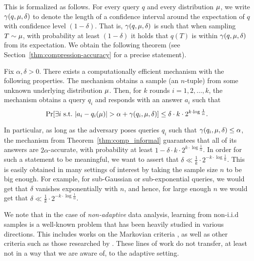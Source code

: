 \documentclass[12pt,a4paper,oneside,onecolumn]{book}
\begin{document}
This is formalized as follows. For every query $q$ and every distribution 
$\mu$, we write $\gamma(q,\mu,\delta)$ to denote the length of a confidence interval around the expectation of $q$ with confidence level $(1-\delta)$. That is, $\gamma(q,\mu,\delta)$ is such that when sampling $T\sim\mu$, with probability at least $(1-\delta)$ it holds that $q(T)$ is within $\gamma(q,\mu,\delta)$ from its expectation. We obtain the following theorem (see Section~\ref{thm:compression-accuracy} for a precise statement).

\begin{theorem}[informal]\label{thm:comp_informal}
Fix $\alpha,\delta>0$. 
There exists a computationally efficient mechanism with the following properties. The mechanism obtains a sample (an $n$-tuple) from some unknown underlying distribution $\mu$. Then, for $k$ rounds $i=1,2,\dots,k$, the mechanism obtains a query $q_i$ and responds with an answer $a_i$ such that 
$$
\Pr[\exists i \text{ s.t.\ } |a_i-q_i(\measure)|>\alpha+\gamma(q_i,\measure,\delta)]\leq \delta\cdot k \cdot 2^{k\cdot\log\frac{1}{\alpha}}.
$$
\end{theorem}

In particular, as long as the adversary poses queries $q_i$ such that $\gamma(q_i,\mu,\delta)\leq\alpha$, the mechanism from Theorem~\ref{thm:comp_informal} guarantees that all of its answers are $2\alpha$-accurate, with probability at least $1-\delta\cdot k \cdot 2^{k\cdot\log\frac{1}{\alpha}}$. In order for such a statement to be  meaningful, we want to assert that $\delta\ll\frac{1}{k} \cdot 2^{-k\cdot\log\frac{1}{\alpha}}$. This is easily obtained in many settings of interest by taking the sample size $n$ to be big enough. For example, for sub-Gaussian or sub-exponential queries, we would get that $\delta$ vanishes exponentially with $n$, and hence, for large enough $n$ we would get that $\delta\ll\frac{1}{k} \cdot 2^{-k\cdot\log\frac{1}{\alpha}}$.

We note that in the case of {\em non-adaptive} data analysis, learning from non-i.i.d samples is a well-known problem that has been heavily studied in various directions. 
This includes works on the Markovian criteria  \cite{marton_measure_1996,kontorovich2017concentration,DBLP:conf/alt/WolferK19,juang1991hidden}, 
as well as other criteria such as those researched by \cite{DBLP:conf/stoc/DaskalakisDP19,DBLP:conf/colt/DaganDDJ19}. 
These lines of work do not transfer, at least not in a way that we are aware of, to the adaptive setting.
\end{document}
